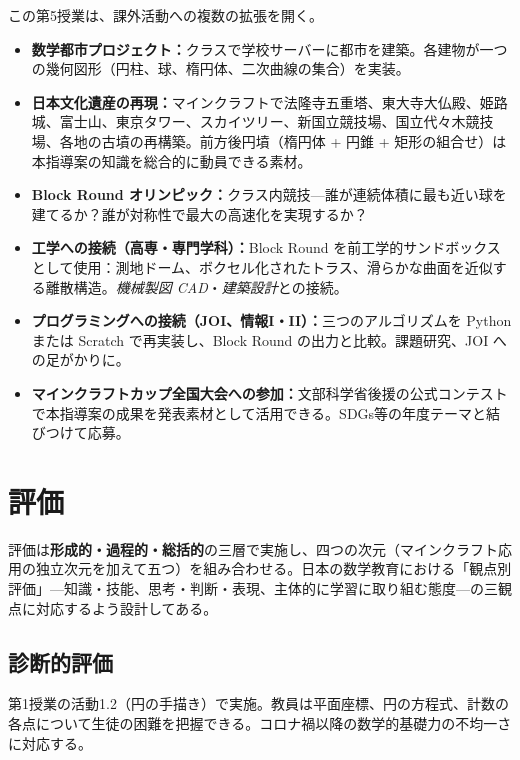 \documentclass[12pt,a4paper]{scrartcl}
\newcommand{\acc}[1]{\textcolor{accent}{\textbf{#1}}}
\begin{document}
\begin{minecraft}[拡張の可能性]
この第5授業は、課外活動への複数の拡張を開く。
\begin{itemize}[leftmargin=1.3em,itemsep=0.15em,topsep=0.3em,nosep]
  \item \textbf{数学都市プロジェクト：}クラスで学校サーバーに都市を建築。各建物が一つの幾何図形（円柱、球、楕円体、二次曲線の集合）を実装。
  \item \textbf{日本文化遺産の再現：}マインクラフトで法隆寺五重塔、東大寺大仏殿、姫路城、富士山、東京タワー、スカイツリー、新国立競技場、国立代々木競技場、各地の古墳の再構築。前方後円墳（楕円体 + 円錐 + 矩形の組合せ）は本指導案の知識を総合的に動員できる素材。
  \item \textbf{Block Round オリンピック：}クラス内競技---誰が連続体積に最も近い球を建てるか？誰が対称性で最大の高速化を実現するか？
  \item \textbf{工学への接続（高専・専門学科）：}Block Round を前工学的サンドボックスとして使用：測地ドーム、ボクセル化されたトラス、滑らかな曲面を近似する離散構造。\emph{機械製図 CAD}・\emph{建築設計}との接続。
  \item \textbf{プログラミングへの接続（JOI、情報I・II）：}三つのアルゴリズムを Python または Scratch で再実装し、Block Round の出力と比較。課題研究、JOI への足がかりに。
  \item \textbf{マインクラフトカップ全国大会への参加：}文部科学省後援の公式コンテストで本指導案の成果を発表素材として活用できる。SDGs等の年度テーマと結びつけて応募。
\end{itemize}
\end{minecraft}

\section{評価}\label{sec:avaliacao}

評価は\acc{形成的・過程的・総括的}の三層で実施し、四つの次元（マインクラフト応用の独立次元を加えて五つ）を組み合わせる。日本の数学教育における「観点別評価」---知識・技能、思考・判断・表現、主体的に学習に取り組む態度---の三観点に対応するよう設計してある。

\subsection{診断的評価}
第1授業の活動1.2（円の手描き）で実施。教員は平面座標、円の方程式、計数の各点について生徒の困難を把握できる。コロナ禍以降の数学的基礎力の不均一さに対応する。
\end{document}
